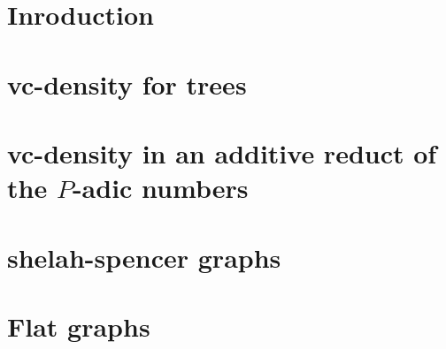 \documentclass{report}
\begin{document}
%

 
\tableofcontents{}

\chapter{Inroduction}



\chapter{vc-density for trees}


 
\chapter{vc-density in an additive reduct of the $P$-adic numbers}



\chapter{shelah-spencer graphs}



\chapter{Flat graphs}


\end{document}
